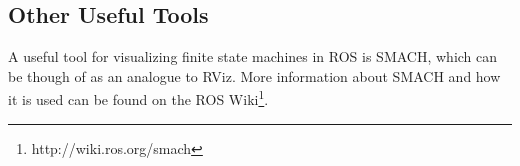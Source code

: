 \begin{example}
\subsection{Other Useful Tools}
A useful tool for visualizing finite state machines in ROS is SMACH, which can be though of as an analogue to RViz. More information about SMACH and how it is used can be found on the ROS Wiki\footnote{http://wiki.ros.org/smach}. 
\end{example}